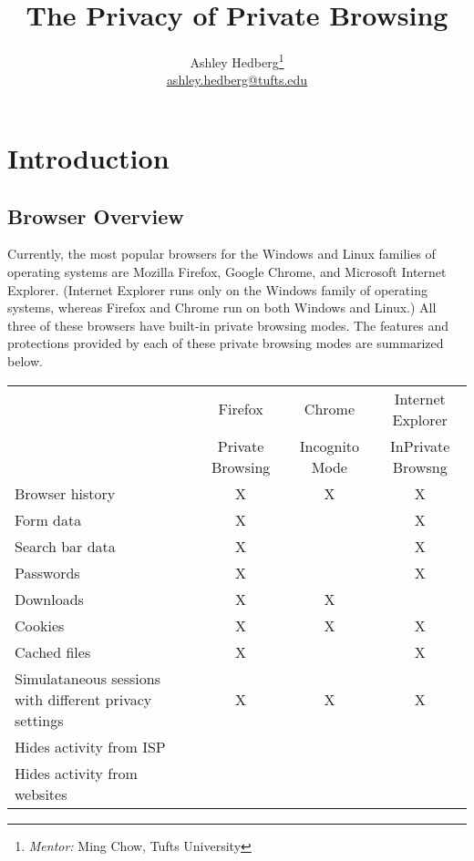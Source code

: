 \documentclass[pdftex,letterpaper,11pt]{article}
\begin{document}
  \title{The Privacy of Private Browsing}
  \author{Ashley Hedberg\thanks{\emph{Mentor:} Ming Chow, Tufts University} \\
  \href{mailto:ashley.hedberg@tufts.edu}{ashley.hedberg@tufts.edu}}
  \date{}
  \maketitle
  
  \begin{abstract}
  \end{abstract}

  \section{Introduction}
    \subsection{Browser Overview}
    Currently, the most popular browsers for the Windows and Linux families of
    operating systems are Mozilla Firefox, Google Chrome, and Microsoft 
    Internet Explorer. (Internet Explorer runs only on the Windows family of
    operating systems, whereas Firefox and Chrome run on both Windows and 
    Linux.) All three of these browsers have built-in private browsing modes.
    The features and protections provided by each of these private browsing
    modes are summarized below.\cite{verdi13}\cite{google13}\cite{ie13}

    \begin{center}
      \begin{tabular}{|p{5cm}|c|c|c|}
        \hline
         & Firefox & Chrome & Internet Explorer \\
         & Private Browsing & Incognito Mode & InPrivate Browsng \\
        \hline
        Browser history & X & X & X \\
        \hline
        Form data & X &  & X \\
        \hline
        Search bar data & X &  & X \\
        \hline
        Passwords & X &  & X \\
        \hline
        Downloads & X & X &  \\
        \hline
        Cookies & X & X & X \\
        \hline
        Cached files & X &  & X \\
        \hline
        Simulataneous sessions with different privacy settings & X & X & X \\
        \hline
        Hides activity from ISP &  &  &  \\
        \hline
        Hides activity from websites &  &  &  \\
        \hline
      \end{tabular}
    \end{center}
\end{document}
